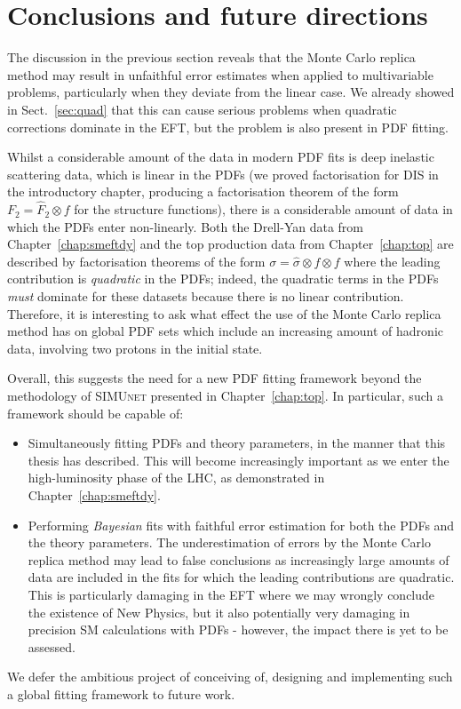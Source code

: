 \documentclass[withindex,glossary]{cam-thesis}
\begin{document}
\section{Conclusions and future directions}
\label{sec:mc_future}

The discussion in the previous section reveals that the Monte Carlo replica method may result in unfaithful error estimates when applied to multivariable problems, particularly when they deviate from the linear case. We already showed in Sect.~\ref{sec:quad} that this can cause serious problems when quadratic corrections dominate in the EFT, but the problem is also present in PDF fitting.

Whilst a considerable amount of the data in modern PDF fits is deep inelastic scattering data, which is linear in the PDFs (we proved factorisation for DIS in the introductory chapter, producing a factorisation theorem of the form $F_2 = \hat{F}_2 \otimes f$ for the structure functions), there is a considerable amount of data in which the PDFs enter non-linearly. Both the Drell-Yan data from Chapter~\ref{chap:smeftdy} and the top production data from Chapter~\ref{chap:top} are described by factorisation theorems of the form $\sigma = \hat{\sigma} \otimes f \otimes f$ where the leading contribution is \textit{quadratic} in the PDFs; indeed, the quadratic terms in the PDFs \textit{must} dominate for these datasets because there is no linear contribution. Therefore, it is interesting to ask what effect the use of the Monte Carlo replica method has on global PDF sets which include an increasing amount of hadronic data, involving two protons in the initial state.

Overall, this suggests the need for a new PDF fitting framework beyond the methodology of \textsc{SIMUnet} presented in Chapter~\ref{chap:top}. In particular, such a framework should be capable of:
\begin{itemize}
\item Simultaneously fitting PDFs and theory parameters, in the manner that this thesis has described. This will become increasingly important as we enter the high-luminosity phase of the LHC, as demonstrated in Chapter~\ref{chap:smeftdy}.
\item Performing \textit{Bayesian} fits with faithful error estimation for both the PDFs and the theory parameters. The underestimation of errors by the Monte Carlo replica method may lead to false conclusions as increasingly large amounts of data are included in the fits for which the leading contributions are quadratic. This is particularly damaging in the EFT where we may wrongly conclude the existence of New Physics, but it also potentially very damaging in precision SM calculations with PDFs - however, the impact there is yet to be assessed.
\end{itemize}
We defer the ambitious project of conceiving of, designing and implementing such a global fitting framework to future work.
\end{document}
